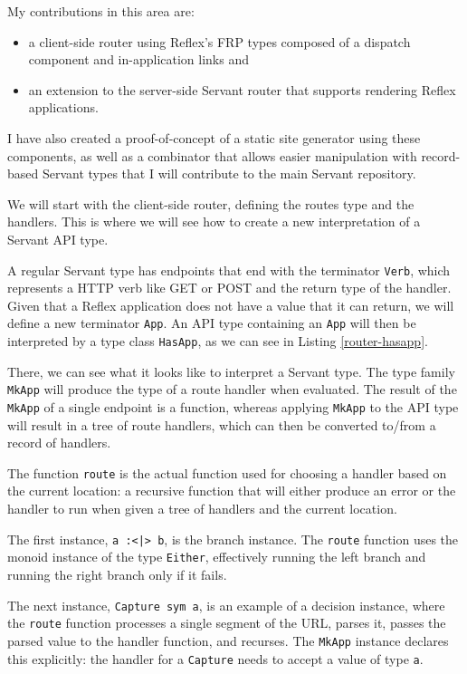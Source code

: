 \documentclass[english,odsaz]{fitthesis}
\begin{document}
My contributions in this area are:
\begin{itemize}
\item a client-side router using Reflex's FRP types composed of a dispatch component
and in-application links and
\item an extension to the server-side Servant router that supports rendering Reflex
applications.
\end{itemize}

I have also created a proof-of-concept of a static site generator using these
components, as well as a combinator that allows easier manipulation with
record-based Servant types that I will contribute to the main Servant
repository.

We will start with the client-side router, defining the routes type and the
handlers. This is where we will see how to create a new interpretation of a
Servant API type.

A regular Servant type has endpoints that end with the terminator \texttt{Verb}, which
represents a HTTP verb like GET or POST and the return type of the
handler. Given that a Reflex application does not have a value that it can
return, we will define a new terminator \texttt{App}. An API type containing an \texttt{App} will
then be interpreted by a type class \texttt{HasApp}, as we can see in Listing
\ref{router-hasapp}.

There, we can see what it looks like to interpret a Servant type. The type
family \texttt{MkApp} will produce the type of a route handler when evaluated. The result
of the \texttt{MkApp} of a single endpoint is a function, whereas applying \texttt{MkApp} to the
API type will result in a tree of route handlers, which can then be converted
to/from a record of handlers.

The function \texttt{route} is the actual function used for choosing a handler based on
the current location: a recursive function that will either produce an error or
the handler to run when given a tree of handlers and the current location.

The first instance, \texttt{a :<|> b}, is the branch instance. The \texttt{route} function uses
the monoid instance of the type \texttt{Either}, effectively running the left branch and
running the right branch only if it fails.

The next instance, \texttt{Capture sym a}, is an example of a decision instance, where
the \texttt{route} function processes a single segment of the URL, parses it, passes the
parsed value to the handler function, and recurses. The \texttt{MkApp} instance declares
this explicitly: the handler for a \texttt{Capture} needs to accept a value of type \texttt{a}.
\end{document}
